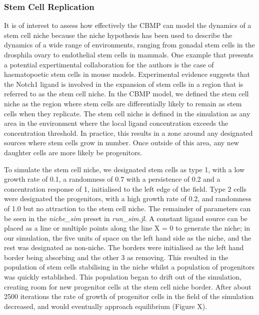 \documentclass[12pt]{article}
\begin{document}
\begin{figure}[H]
\centering
\end{figure}

\subsubsection{Stem Cell Replication}
It is of interest to assess how effectively the CBMP can model the 
dynamics of a stem cell niche because the niche hypothesis has been used 
to describe the dynamics of a wide range of environments, ranging from 
gonadal stem cells in the drosphila ovary to endothelial stem cells in 
mammals. One example that presents a potential expertimental 
collaboration for the authors is the case of haematopoetic stem cells in 
mouse models. Experimental evidence suggests that the Notch1 ligand is 
involved in the expansion of stem cells in a region that is referred to 
as the stem cell niche. In the CBMP model, we defined the stem cell 
niche as the region where stem cells are differentially likely to remain 
as stem cells when they replicate. The stem cell niche is defined in the 
simulation as any area in the environment where the local ligand 
concentration exceeds the concentration threshold. In practice, this 
results in a zone around any designated sources where stem cells grow in 
number. Once outside of this area, any new daughter cells are more 
likely be progenitors. 

To simulate the stem cell niche, we designated stem cells as type 1, 
with a low growth rate of 0.1, a randomness of 0.7 with a persistence of 
0.2 and a concentration response of 1, initialised to the left edge of 
the field. Type 2 cells were designated the progenitors, with a high 
growth rate of 0.2, and randomness of 1.0 but no attraction to the stem 
cell niche. The remainder of parameters can be seen in the {\itshape 
niche\_sim} preset in {\itshape run\_sim.jl}. A constant ligand source can be 
placed as a line or multiple points along the line X = 0 to generate the 
niche; in our simulation, the five units of space on the left hand side 
as the niche, and the rest was designated as non-niche. The borders were 
initialised as the left hand border being absorbing and the other 3 as 
removing. This resulted in the population of stem cells stabilising in 
the niche whilst a population of progenitors was quickly established. 
This population began to drift out of the simulation, creating room for 
new progenitor cells at the stem cell niche border. After about 2500 
iterations the rate of growth of progenitor cells in the field of the 
simulation decreased, and would eventually approach equilibrium (Figure 
X).
\end{document}
